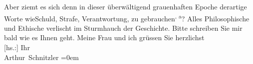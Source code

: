 \begin{ledgroupsized}[t]{13cm}
               Aber ziemt es sich \introOben{}denn\introOben{} in dieser überwältigend grauenhaften
               Epoche derartige Worte \introOben{}wie\introOben{}{ }Schuld, Strafe, Verantwortung, zu gebrauchen\substVorne{}\textsuperscript{, a}\substDazwischen{}? A\substHinten{}lles Philosophische und Ethische verlischt im Sturmhauch der Geschichte.\pend
           \pstart
           Bitte schreiben Sie mir bald wie es Ihnen geht. Meine Frau und ich grüssen Sie herzlichst{\\[\baselineskip]}{[}hs.:{]} Ihr{\\[\baselineskip]}\spacefill\mbox{Arthur Schnitzler}\pend
           \leftskip=0em{}
         
         \endnumbering{}\end{ledgroupsized}  \newcommand{\dateiname}{L02199}\newcommand{\titel}{Arthur Schnitzler an Georg Brandes, 20. 10. 1914}\newcommand{\editorInnen}{Martin Anton Müller und Gerd-Hermann Susen}
      